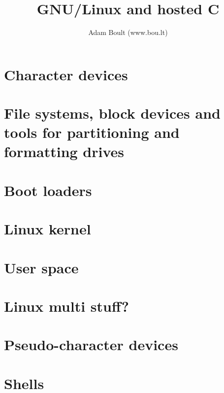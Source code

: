 \documentclass[oneside]{book}
\begin{document}
\author{Adam Boult (www.bou.lt)}
\title{GNU/Linux and hosted C}
\maketitle

\setcounter{tocdepth}{0}
\tableofcontents



\part{Character devices}


\part{File systems, block devices and tools for partitioning and formatting drives}






\part{Boot loaders}



\part{Linux kernel}




\part{User space}




\part{Linux multi stuff?}




\part{Pseudo-character devices}



\part{Shells}




\end{document}
